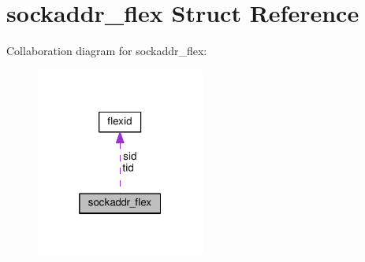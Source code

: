 \hypertarget{structsockaddr__flex}{}\section{sockaddr\+\_\+flex Struct Reference}
\label{structsockaddr__flex}


Collaboration diagram for sockaddr\+\_\+flex\+:\nopagebreak
\begin{figure}[H]
\begin{center}
\leavevmode
\includegraphics[width=157pt]{structsockaddr__flex__coll__graph}
\end{center}
\end{figure}
